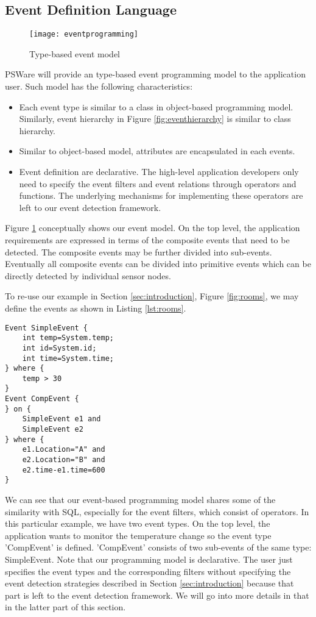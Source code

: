 \subsection{Event Definition Language}
\begin{figure}
\centering
\texttt{[image: eventprogramming]}
\caption{Type-based event model}
\label{fig:eventprogramming}
\end{figure}

PSWare will provide an type-based event programming model to the application user. Such model has the following characteristics:
\begin{itemize}
\item Each event type is similar to a class in object-based programming model. Similarly, event hierarchy in Figure \ref{fig:eventhierarchy} is similar to class hierarchy.
\item Similar to object-based model, attributes are encapsulated in each events.
\item Event definition are declarative. The high-level application developers only need to specify the event filters and event relations through operators and functions. The underlying mechanisms for implementing these operators are left to our event detection framework.
\end{itemize}

Figure \ref{fig:eventprogramming} conceptually shows our event model. On the top level, the application requirements are expressed in terms of the composite events that need to be detected. The composite events may be further divided into sub-events. Eventually all composite events can be divided into primitive events which can be directly detected by individual sensor nodes.

To re-use our example in Section \ref{sec:introduction}, Figure \ref{fig:rooms}, we may define the events as shown in Listing \ref{lst:rooms}.
\begin{lstlisting}[caption=Example of using even-based programming model, label=lst:rooms]
Event SimpleEvent {
	int temp=System.temp;
	int id=System.id;
	int time=System.time;
} where {
	temp > 30
}
Event CompEvent {
} on {
	SimpleEvent e1 and
	SimpleEvent e2
} where {
	e1.Location="A" and
	e2.Location="B" and
	e2.time-e1.time=600
}
\end{lstlisting}

We can see that our event-based programming model shares some of the similarity with SQL, especially for the event filters, which consist of operators. In this particular example, we have two event types. On the top level, the application wants to monitor the temperature change so the event type 'CompEvent' is defined. 'CompEvent' consists of two sub-events of the same type: SimpleEvent. Note that our programming model is declarative. The user just specifies the event types and the corresponding filters without specifying the event detection strategies described in Section \ref{sec:introduction} because that part is left to the event detection framework. We will go into more details in that in the latter part of this section.

